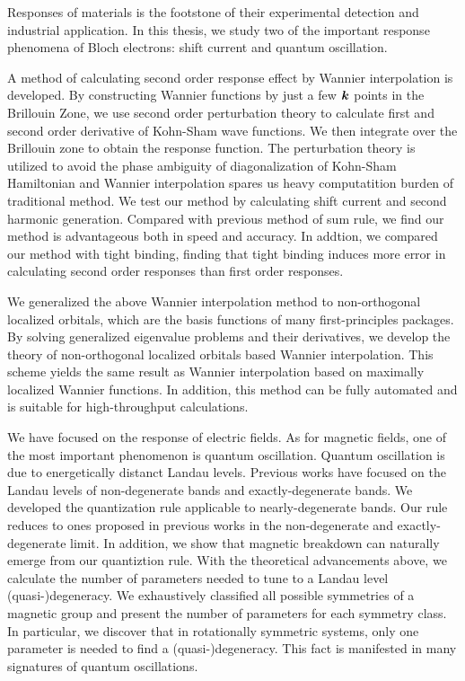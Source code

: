 \begin{eabstract}
  Responses of materials is the footstone of their experimental detection and industrial application. In this thesis, we study two of the important response phenomena of Bloch electrons: shift current and quantum oscillation.

  A method of calculating second order response effect by Wannier interpolation is developed. By constructing Wannier functions by just a few $\boldsymbol{k}$ points in the Brillouin Zone, we use second order perturbation theory to calculate first and second order derivative of Kohn-Sham wave functions. We then integrate over the Brillouin zone to obtain the response function. The perturbation theory is utilized to avoid the phase ambiguity of diagonalization of Kohn-Sham Hamiltonian and Wannier interpolation spares us heavy computatition burden of traditional method. We test our method by calculating shift current and second harmonic generation. Compared with previous method of sum rule, we find our method is advantageous both in speed and accuracy. In addtion, we compared our method with tight binding, finding that tight binding induces more error in calculating second order responses than first order responses.

  We generalized the above Wannier interpolation method to non-orthogonal localized orbitals, which are the basis functions of many first-principles packages. By solving generalized eigenvalue problems and their derivatives, we develop the theory of non-orthogonal localized orbitals based Wannier interpolation. This scheme yields the same result as Wannier interpolation based on maximally localized Wannier functions. In addition, this method can be fully automated and is suitable for high-throughput calculations.

  We have focused on the response of electric fields. As for magnetic fields, one of the most important phenomenon is quantum oscillation. Quantum oscillation is due to energetically distanct Landau levels. Previous works have focused on the Landau levels of non-degenerate bands and exactly-degenerate bands. We developed the quantization rule applicable to nearly-degenerate bands. Our rule reduces to ones proposed in previous works in the non-degenerate and exactly-degenerate limit. In addition, we show that magnetic breakdown can naturally emerge from our quantiztion rule. With the theoretical advancements above, we calculate the number of parameters needed to tune to a Landau level (quasi-)degeneracy. We exhaustively classified all possible symmetries of a magnetic group and present the number of parameters for each symmetry class. In particular, we discover that in rotationally symmetric systems, only one parameter is needed to find a (quasi-)degeneracy. This fact is manifested in many signatures of quantum oscillations.
\end{eabstract}
